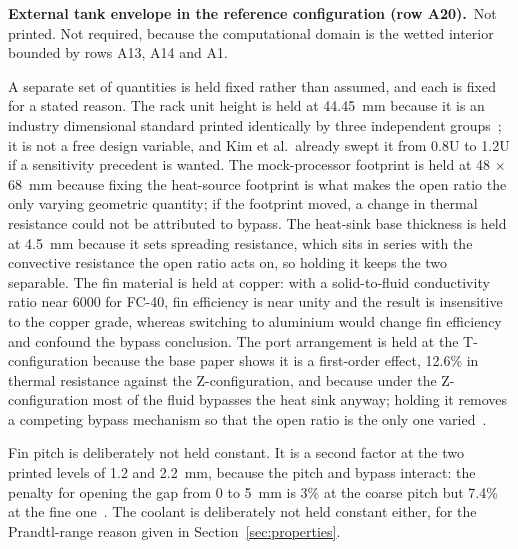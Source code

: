 \noindent\textbf{External tank envelope in the reference configuration (row A20).}\ Not printed. Not required,
because the computational domain is the wetted interior bounded by rows A13, A14 and A1.

A separate set of quantities is held fixed rather than assumed, and each is fixed for a stated
reason. The rack unit height is held at 44.45~mm because it is an industry dimensional standard
printed identically by three independent groups~\cite{muneeshwaran2023,chun2026,kim2025}; it is not
a free design variable, and Kim et al.\ already swept it from 0.8U to 1.2U if a sensitivity
precedent is wanted. The mock-processor footprint is held at 48 $\times$ 68~mm because fixing the
heat-source footprint is what makes the open ratio the only varying geometric quantity; if the
footprint moved, a change in thermal resistance could not be attributed to bypass. The heat-sink
base thickness is held at 4.5~mm because it sets spreading resistance, which sits in series with
the convective resistance the open ratio acts on, so holding it keeps the two separable. The fin
material is held at copper: with a solid-to-fluid conductivity ratio near 6000 for FC-40, fin
efficiency is near unity and the result is insensitive to the copper grade, whereas switching to
aluminium would change fin efficiency and confound the bypass conclusion. The port arrangement is
held at the T-configuration because the base paper shows it is a first-order effect, 12.6\% in
thermal resistance against the Z-configuration, and because under the Z-configuration most of the
fluid bypasses the heat sink anyway; holding it removes a competing bypass mechanism so that the
open ratio is the only one varied~\cite{muneeshwaran2023}.

Fin pitch is deliberately not held constant. It is a second factor at the two printed levels of
1.2 and 2.2~mm, because the pitch and bypass interact: the penalty for opening the gap from 0 to
5~mm is 3\% at the coarse pitch but 7.4\% at the fine one~\cite{muneeshwaran2023}. The coolant is
deliberately not held constant either, for the Prandtl-range reason given in
Section~\ref{sec:properties}.
